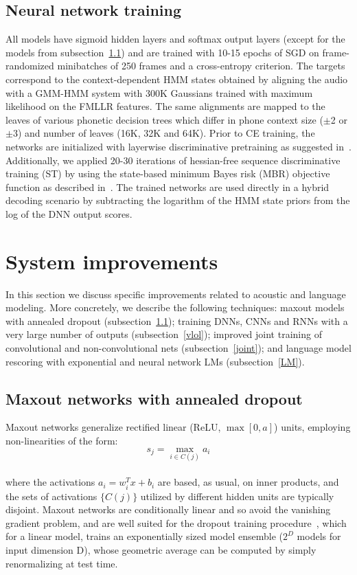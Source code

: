 \documentclass[a4paper]{article}
\begin{document}
\subsection{Neural network training} 
All models have sigmoid hidden layers and softmax output layers
(except for the models from subsection~\ref{maxout}) and are trained
with 10-15 epochs of SGD on frame-randomized minibatches of 250 frames
and a cross-entropy criterion. The targets correspond to the
context-dependent HMM states obtained by aligning the audio with a
GMM-HMM system with 300K Gaussians trained with maximum likelihood on
the FMLLR features. The same alignments are mapped to the leaves of various
phonetic decision trees which differ in phone context size
($\pm$2 or $\pm$3) and number of leaves (16K, 32K and
64K). Prior to CE training, the networks are initialized with
layerwise discriminative pretraining as suggested
in~\cite{seide11}. Additionally, we applied 20-30 iterations of
hessian-free sequence discriminative training (ST) by using the state-based
minimum Bayes risk (MBR) objective function as described
in~\cite{bedk12}. The trained networks are used directly in a
hybrid decoding scenario by subtracting the logarithm of the HMM state
priors from the log of the DNN output scores.

\section{System improvements}
\label{improvements}

In this section we discuss specific improvements related to acoustic
and language modeling. More concretely, we describe the following
techniques: maxout models with annealed dropout
(subsection~\ref{maxout}); training DNNs, CNNs and RNNs with a very
large number of outputs (subsection~\ref{vlol}); improved joint
training of convolutional and non-convolutional nets
(subsection~\ref{joint}); and language model rescoring with
exponential and neural network LMs (subsection~\ref{LM}).

\subsection{Maxout networks with annealed dropout}
\label{maxout}
Maxout networks \cite{goodfellow13} generalize rectified linear
(ReLU, $\max[0,a]$) units, employing non-linearities of the form:
\begin{equation}
s_j = \max_{i\in C(j)} a_i
\end{equation}
~~\\
where the activations $a_i = w^T_{i}x +b_i$ are based, as usual, on
inner products, and the sets of activations $\{C(j)\}$ utilized by
different hidden units are typically disjoint. Maxout networks are
conditionally linear and so avoid the vanishing gradient problem, and
are well suited for the dropout training
procedure~\cite{srivastava14}, which for a linear model, trains an
exponentially sized model ensemble ($2^D$ models for input dimension
D), whose geometric average can be computed by simply renormalizing at
test time.
\end{document}
